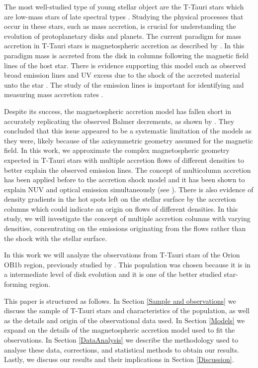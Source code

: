 \documentclass[twocolumn,linenumbers]{aastex631}
\begin{document}
The most well-studied type of young stellar object are the T-Tauri stars which  are low-mass stars of late spectral types \citep{hartmann2016}. Studying the physical processes that occur in these stars, such as mass accretion, is crucial for understanding the evolution of protoplanetary disks and planets. The current paradigm for mass accretion in T-Tauri stars is magnetospheric accretion as described by \citet{hartmann2016}. In this paradigm mass is accreted from the disk in columns following the magnetic field lines of the host star. There is evidence supporting this model such as observed broad emission lines \citep{muzerolle2001} and UV excess due to the shock of the accreted material unto the star \citep{calvet_gullbring1998}. The study of the emission lines is important for identifying and measuring mass accretion rates \citep{hartmann1994, muzerolle1998a, muzerolle1998b, muzerolle2001}.


Despite its success, the magnetospheric accretion model has fallen short in accurately replicating the observed Balmer decrements, as shown by \citet{micolta2023}. They concluded that this issue appeared to be a systematic limitation of the models as they were, likely because of the axisymmetric geometry assumed for the magnetic field. In this work, we approximate the complex magnetospheric geometry expected in T-Tauri stars with multiple accretion flows of different densities to better explain the observed emission lines. The concept of multicolumn accretion has been applied before to the accretion shock model and it has been shown to explain NUV and optical emission simultaneously (see \citet{ingleby2013, pittman2022}). There is also evidence of density gradients in the hot spots left on the stellar surface by the accretion columns \citep{espaillat2021} which could indicate an origin on flows of different densities. In this study, we will investigate the concept of multiple accretion columns with varying densities, concentrating on the emissions originating from the flows rather than the shock with the stellar surface.

In this work we will analyze the observations from T-Tauri stars of the Orion OB1b region, previously studied by \citet{manara2021}. This population was chosen because it is in a intermediate level of disk evolution and it is one of the better studied star-forming region.

This paper is structured as follows. In Section \ref{Sample and observations} we discuss the sample of T-Tauri stars and characteristics of the population, as well as the details and origin of the observational data used. In Section \ref{Models} we expand on the details of the magnetospheric accretion model used to fit the observations. In Section \ref{DataAnalysis} we describe the methodology used to analyse these data, corrections, and statistical methods to obtain our results. Lastly, we discuss our results and their implications in Section \ref{Discussion}.
\end{document}
